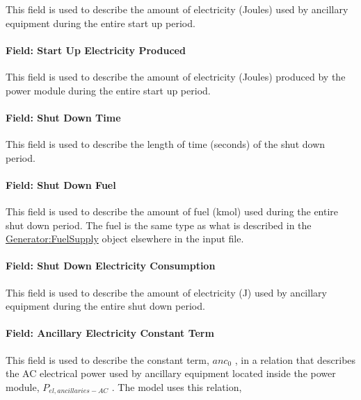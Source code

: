 This field is used to describe the amount of electricity (Joules) used by ancillary equipment during the entire start up period.

\paragraph{Field: Start Up Electricity Produced}\label{field-start-up-electricity-produced}

This field is used to describe the amount of electricity (Joules) produced by the power module during the entire start up period.

\paragraph{Field: Shut Down Time}\label{field-shut-down-time}

This field is used to describe the length of time (seconds) of the shut down period.

\paragraph{Field: Shut Down Fuel}\label{field-shut-down-fuel}

This field is used to describe the amount of fuel (kmol) used during the entire shut down period. The fuel is the same type as what is described in the \hyperref[generatorfuelsupply]{Generator:FuelSupply} object elsewhere in the input file.

\paragraph{Field: Shut Down Electricity Consumption}\label{field-shut-down-electricity-consumption}

This field is used to describe the amount of electricity (J) used by ancillary equipment during the entire shut down period.

\paragraph{Field: Ancillary Electricity Constant Term}\label{field-ancillary-electricity-constant-term}

This field is used to describe the constant term, \(an{c_0}\) , in a relation that describes the AC electrical power used by ancillary equipment located inside the power module, \({P_{el,ancillaries - AC}}\) . The model uses this relation,

